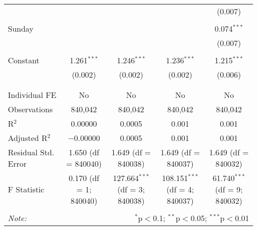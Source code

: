 \documentclass[
]{article}
\begin{document}
\begin{table}[!htbp]
{\begin{tabular}{@{\extracolsep{5pt}}lcccc}
  &  &  &  & (0.007) \\ 
  & & & & \\ 
 Sunday &  &  &  & 0.074$^{***}$ \\ 
  &  &  &  & (0.007) \\ 
  & & & & \\ 
 Constant & 1.261$^{***}$ & 1.246$^{***}$ & 1.236$^{***}$ & 1.215$^{***}$ \\ 
  & (0.002) & (0.002) & (0.002) & (0.006) \\ 
  & & & & \\ 
\hline \\[-1.8ex] 
Individual FE & No & No & No & No \\ 
Observations & 840,042 & 840,042 & 840,042 & 840,042 \\ 
R$^{2}$ & 0.00000 & 0.0005 & 0.001 & 0.001 \\ 
Adjusted R$^{2}$ & $-$0.00000 & 0.0005 & 0.001 & 0.001 \\ 
Residual Std. Error & 1.650 (df = 840040) & 1.649 (df = 840038) & 1.649 (df = 840037) & 1.649 (df = 840032) \\ 
F Statistic & 0.170 (df = 1; 840040) & 127.664$^{***}$ (df = 3; 840038) & 108.151$^{***}$ (df = 4; 840037) & 61.740$^{***}$ (df = 9; 840032) \\ 
\hline 
\hline \\[-1.8ex] 
\textit{Note:}  & \multicolumn{4}{r}{$^{*}$p$<$0.1; $^{**}$p$<$0.05; $^{***}$p$<$0.01} \\ 
\end{tabular}
} 
\end{table} 
\newpage
\end{document}
